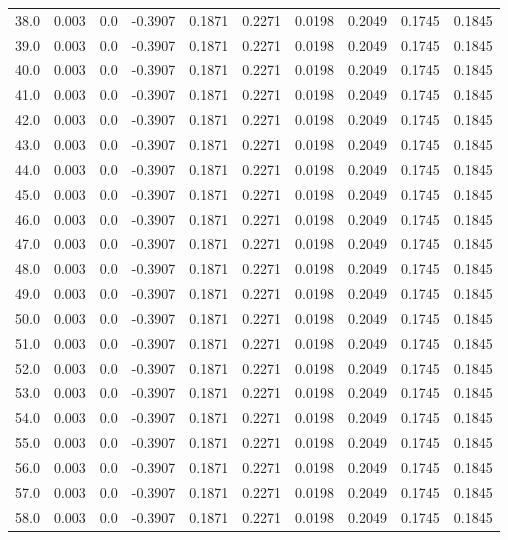 \begin{longtable}{lrrrrrrrrr}
38.0 & 0.003 & 0.0 & -0.3907 & 0.1871 & 0.2271 & 0.0198 & 0.2049 & 0.1745 & 0.1845 \\
39.0 & 0.003 & 0.0 & -0.3907 & 0.1871 & 0.2271 & 0.0198 & 0.2049 & 0.1745 & 0.1845 \\
40.0 & 0.003 & 0.0 & -0.3907 & 0.1871 & 0.2271 & 0.0198 & 0.2049 & 0.1745 & 0.1845 \\
41.0 & 0.003 & 0.0 & -0.3907 & 0.1871 & 0.2271 & 0.0198 & 0.2049 & 0.1745 & 0.1845 \\
42.0 & 0.003 & 0.0 & -0.3907 & 0.1871 & 0.2271 & 0.0198 & 0.2049 & 0.1745 & 0.1845 \\
43.0 & 0.003 & 0.0 & -0.3907 & 0.1871 & 0.2271 & 0.0198 & 0.2049 & 0.1745 & 0.1845 \\
44.0 & 0.003 & 0.0 & -0.3907 & 0.1871 & 0.2271 & 0.0198 & 0.2049 & 0.1745 & 0.1845 \\
45.0 & 0.003 & 0.0 & -0.3907 & 0.1871 & 0.2271 & 0.0198 & 0.2049 & 0.1745 & 0.1845 \\
46.0 & 0.003 & 0.0 & -0.3907 & 0.1871 & 0.2271 & 0.0198 & 0.2049 & 0.1745 & 0.1845 \\
47.0 & 0.003 & 0.0 & -0.3907 & 0.1871 & 0.2271 & 0.0198 & 0.2049 & 0.1745 & 0.1845 \\
48.0 & 0.003 & 0.0 & -0.3907 & 0.1871 & 0.2271 & 0.0198 & 0.2049 & 0.1745 & 0.1845 \\
49.0 & 0.003 & 0.0 & -0.3907 & 0.1871 & 0.2271 & 0.0198 & 0.2049 & 0.1745 & 0.1845 \\
50.0 & 0.003 & 0.0 & -0.3907 & 0.1871 & 0.2271 & 0.0198 & 0.2049 & 0.1745 & 0.1845 \\
51.0 & 0.003 & 0.0 & -0.3907 & 0.1871 & 0.2271 & 0.0198 & 0.2049 & 0.1745 & 0.1845 \\
52.0 & 0.003 & 0.0 & -0.3907 & 0.1871 & 0.2271 & 0.0198 & 0.2049 & 0.1745 & 0.1845 \\
53.0 & 0.003 & 0.0 & -0.3907 & 0.1871 & 0.2271 & 0.0198 & 0.2049 & 0.1745 & 0.1845 \\
54.0 & 0.003 & 0.0 & -0.3907 & 0.1871 & 0.2271 & 0.0198 & 0.2049 & 0.1745 & 0.1845 \\
55.0 & 0.003 & 0.0 & -0.3907 & 0.1871 & 0.2271 & 0.0198 & 0.2049 & 0.1745 & 0.1845 \\
56.0 & 0.003 & 0.0 & -0.3907 & 0.1871 & 0.2271 & 0.0198 & 0.2049 & 0.1745 & 0.1845 \\
57.0 & 0.003 & 0.0 & -0.3907 & 0.1871 & 0.2271 & 0.0198 & 0.2049 & 0.1745 & 0.1845 \\
58.0 & 0.003 & 0.0 & -0.3907 & 0.1871 & 0.2271 & 0.0198 & 0.2049 & 0.1745 & 0.1845 \\

\end{longtable}
